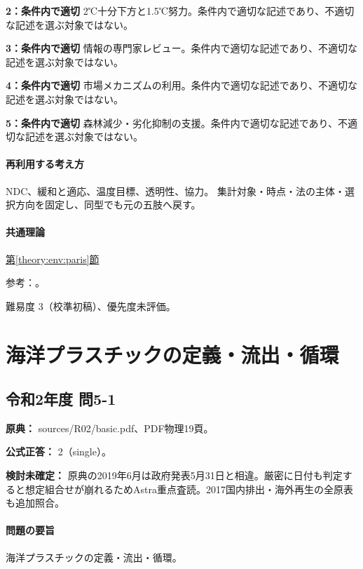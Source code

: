 \noindent\textbf{2：条件内で適切} 2℃十分下方と1.5℃努力。条件内で適切な記述であり、不適切な記述を選ぶ対象ではない。\par

\noindent\textbf{3：条件内で適切} 情報の専門家レビュー。条件内で適切な記述であり、不適切な記述を選ぶ対象ではない。\par

\noindent\textbf{4：条件内で適切} 市場メカニズムの利用。条件内で適切な記述であり、不適切な記述を選ぶ対象ではない。\par

\noindent\textbf{5：条件内で適切} 森林減少・劣化抑制の支援。条件内で適切な記述であり、不適切な記述を選ぶ対象ではない。\par

\paragraph{再利用する考え方} NDC、緩和と適応、温度目標、透明性、協力。 集計対象・時点・法の主体・選択方向を固定し、同型でも元の五肢へ戻す。

\paragraph{共通理論} \hyperref[theory:env:paris]{第\ref*{theory:env:paris}節}

\par 参考：\cite{env59_ndc}。

\par 難易度 3（校準初稿）、優先度未評価。

\section{海洋プラスチックの定義・流出・循環}

\subsection{令和2年度 問5-1}
\label{q:r02-reg-basic-5-1}

\noindent\textbf{原典：} sources/R02/basic.pdf、PDF物理19頁。

\textbf{公式正答：} 2（single）。

\par\textbf{検討未確定：} 原典の2019年6月は政府発表5月31日と相違。厳密に日付も判定すると想定組合せが崩れるためAstra重点査読。2017国内排出・海外再生の全原表も追加照合。

\paragraph{問題の要旨} 海洋プラスチックの定義・流出・循環。

